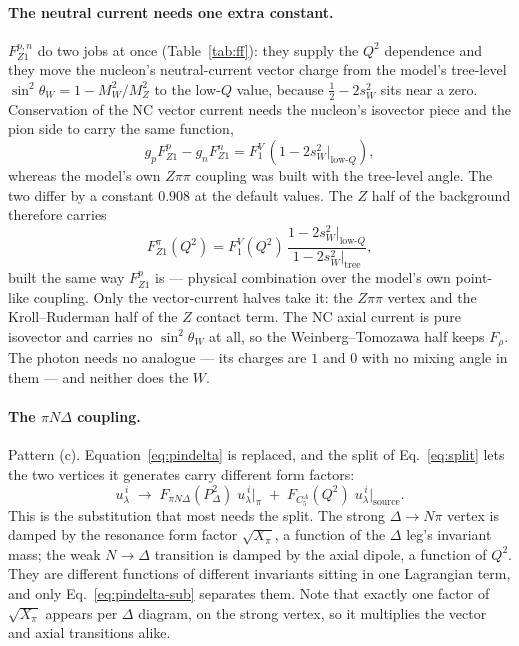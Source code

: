 \documentclass[11pt,a4paper]{article}
\begin{document}
\paragraph{The neutral current needs one extra constant.} $F_{Z1}^{p,n}$ do two
jobs at once (Table~\ref{tab:ff}): they supply the $Q^2$ dependence and they
move the nucleon's neutral-current vector charge from the model's tree-level
$\sin^2\theta_W = 1 - M_W^2/M_Z^2$ to the low-$Q$ value, because
$\tfrac12 - 2s_W^2$ sits near a zero. Conservation of the NC vector current
needs the nucleon's isovector piece and the pion side to carry the same
function,
\begin{equation}
  g_p F_{Z1}^{p} - g_n F_{Z1}^{n} = F_1^V\,(1 - 2 s_W^2\big|_{\text{low-}Q}) ,
\end{equation}
whereas the model's own $Z\pi\pi$ coupling was built with the tree-level angle.
The two differ by a constant $0.908$ at the default values. The $Z$ half of the
background therefore carries
\begin{equation}
  F_{Z1}^{\pi}(Q^2) = F_1^V(Q^2)\,
    \frac{1 - 2 s_W^2\big|_{\text{low-}Q}}{1 - 2 s_W^2\big|_{\text{tree}}},
\end{equation}
built the same way $F_{Z1}^{p}$ is --- physical combination over the model's own
point-like coupling. Only the vector-current halves take it: the $Z\pi\pi$
vertex and the Kroll--Ruderman half of the $Z$ contact term. The NC axial
current is pure isovector and carries no $\sin^2\theta_W$ at all, so the
Weinberg--Tomozawa half keeps $F_\rho$. The photon needs no analogue --- its
charges are $1$ and $0$ with no mixing angle in them --- and neither does the
$W$.

\paragraph{The $\pi N\Delta$ coupling.} Pattern (c). Equation~\eqref{eq:pindelta}
is replaced, and the split of Eq.~\eqref{eq:split} lets the two vertices it
generates carry different form factors:
\begin{equation}
  u_\lambda^{\,i} \;\longrightarrow\;
  F_{\pi N\Delta}(P_\Delta^2)\; u_\lambda^{\,i}\Big|_{\pi}
  \;+\;
  F_{C_5^A}(Q^2)\; u_\lambda^{\,i}\Big|_{\text{source}} .
  \label{eq:pindelta-sub}
\end{equation}
This is the substitution that most needs the split. The strong $\Delta\to N\pi$
vertex is damped by the resonance form factor $\sqrt{X_\pi}$, a function of the
$\Delta$ leg's invariant mass; the weak $N\to\Delta$ transition is damped by the
axial dipole, a function of $Q^2$. They are different functions of different
invariants sitting in one Lagrangian term, and only Eq.~\eqref{eq:pindelta-sub}
separates them. Note that exactly one factor of $\sqrt{X_\pi}$ appears per
$\Delta$ diagram, on the strong vertex, so it multiplies the vector and axial
transitions alike.
\end{document}
